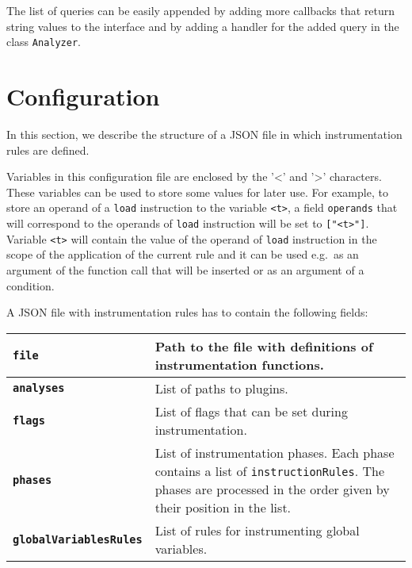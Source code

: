 The list of queries can be easily appended by adding more callbacks that return
string values to the interface and by adding a handler for the added query in the
class \texttt{Analyzer}.


\section{Configuration}\label{sec:config}

In this section, we describe the structure of a JSON file in which
instrumentation rules are defined.

Variables in this configuration file are enclosed by the '<' and '>'
characters. These variables can be used to store some values for later use. For
example, to store an operand of a \texttt{load} instruction to the variable
\texttt{<t>}, a field \texttt{operands} that will correspond to the operands of
\texttt{load} instruction will be set to \texttt{["<t>"]}.  Variable
\texttt{<t>} will contain the value of the operand of \texttt{load} instruction
in the scope of the application of the current rule and it can be used e.g.~as
an argument of the function call that will be inserted or as an argument
of a condition.

A JSON file with instrumentation rules has to contain the following fields:

\begin{center}
\begin{tabular}[h]{>{\bfseries}p{4.3cm} | p{7.7cm}}
  \texttt{file}                & Path to the file with definitions of instrumentation functions. \\
  \hline
  \texttt{analyses}            & List of paths to plugins. \\
  \hline
  \texttt{flags}               & List of flags that can be set during instrumentation. \\
  \hline \texttt{phases}              & List of instrumentation phases. Each
  phase contains a list of \texttt{instructionRules}. The phases are processed
  in the order given by their position in the list. \\
  \hline
  \texttt{globalVariablesRules} & List of rules for instrumenting global
                                 variables.

\end{tabular}
\end{center}

